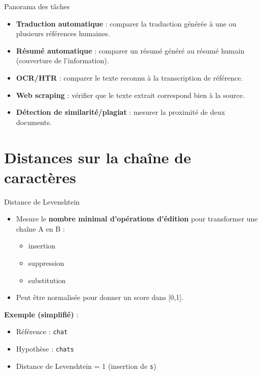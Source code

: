 \documentclass[10pt]{beamer}
\begin{document}
\begin{frame}{Panorama des tâches}
  \begin{itemize}
    \item \textbf{Traduction automatique} : comparer la traduction générée à une ou plusieurs références humaines.
    \item \textbf{Résumé automatique} : comparer un résumé généré au résumé humain (couverture de l'information).
    \item \textbf{OCR/HTR} : comparer le texte reconnu à la transcription de référence.
    \item \textbf{Web scraping} : vérifier que le texte extrait correspond bien à la source.
    \item \textbf{Détection de similarité/plagiat} : mesurer la proximité de deux documents.
  \end{itemize}
\end{frame}

\section{Distances sur la chaîne de caractères}

\begin{frame}{Distance de Levenshtein}
  \begin{itemize}
    \item Mesure le \textbf{nombre minimal d'opérations d'édition} pour transformer une chaîne A en B :
    \begin{itemize}
      \item insertion
      \item suppression
      \item substitution
    \end{itemize}
    \item Peut être normalisée pour donner un score dans [0,1].
  \end{itemize}

  \vspace{0.3cm}
  \textbf{Exemple (simplifié)} :
  \begin{itemize}
    \item Référence : \texttt{chat}
    \item Hypothèse : \texttt{chats}
    \item Distance de Levenshtein = 1 (insertion de \texttt{s})
  \end{itemize}
\end{frame}
\end{document}
